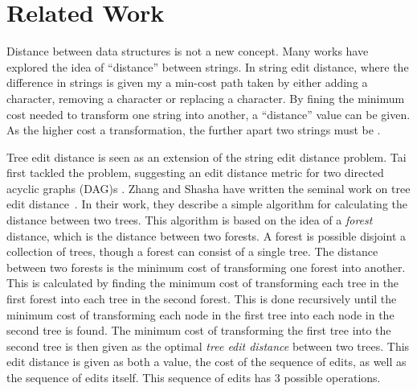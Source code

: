 



\section{Related Work}

Distance between data structures is not a new concept. Many works have explored the idea of ``distance'' between strings. In string edit distance, where the difference in strings is given my a min-cost path taken by either adding a character, removing a character or replacing a character. By fining the minimum cost needed to transform one string into another, a ``distance'' value can be given. As the higher cost a transformation, the further apart two strings must be .

Tree edit distance is seen as an extension of the string edit distance problem. Tai first tackled the problem, suggesting an edit distance metric for two directed acyclic graphs (DAG)s \cite{tai_tree--tree_1979}. Zhang and Shasha have written the seminal work on tree edit distance~\cite{zhang_simple_1989}. In their work, they describe a simple algorithm for calculating the distance between two trees. This algorithm is based on the idea of a \textit{forest} distance, which is the distance between two forests. A forest is possible disjoint a collection of trees, though a forest can consist of a single tree. The distance between two forests is the minimum cost of transforming one forest into another. This is calculated by finding the minimum cost of transforming each tree in the first forest into each tree in the second forest. This is done recursively until the minimum cost of transforming each node in the first tree into each node in the second tree is found. The minimum cost of transforming the first tree into the second tree is then given as the optimal \emph{tree edit distance} between two trees. This edit distance is given as both a value, the cost of the sequence of edits, as well as the sequence of edits itself. This sequence of edits has 3 possible operations.

